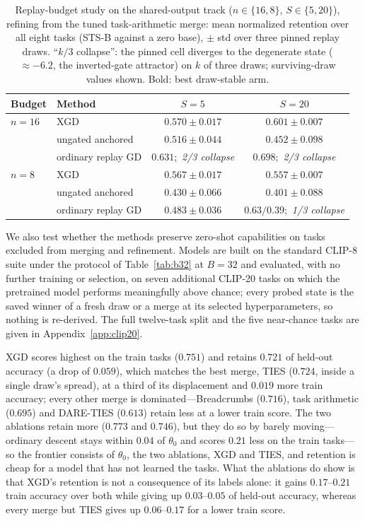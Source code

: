 \documentclass{article} %
\begin{document}
\begin{table}[t]
\centering
\small
\caption{Replay-budget study on the shared-output track ($n\in\{16,8\}$, $S\in\{5,20\}$), refining from the tuned task-arithmetic merge: mean normalized retention over all eight tasks (STS-B against a zero base), $\pm$ std over three pinned replay draws. ``$k/3$ collapse'': the pinned cell diverges to the degenerate state (${\approx}{-}6.2$, the inverted-gate attractor) on $k$ of three draws; surviving-draw values shown. Bold: best draw-stable arm.}
\label{tab:t5budget}
\begin{tabular}{llcc}
\toprule
Budget & Method & $S=5$ & $S=20$ \\
\midrule
$n=16$ & XGD                 & $\mathbf{0.570\pm0.017}$ & $\mathbf{0.601\pm0.007}$ \\
       & ungated anchored    & $0.516\pm0.044$          & $0.452\pm0.098$ \\
       & ordinary replay GD  & $0.631$;\ \emph{2/3 collapse} & $0.698$;\ \emph{2/3 collapse} \\
\midrule
$n=8$  & XGD                 & $\mathbf{0.567\pm0.017}$ & $\mathbf{0.557\pm0.007}$ \\
       & ungated anchored    & $0.430\pm0.066$          & $0.401\pm0.088$ \\
       & ordinary replay GD  & $0.483\pm0.036$          & $0.63/0.39$;\ \emph{1/3 collapse} \\
\bottomrule
\end{tabular}
\end{table}
\fi

We also test whether the methods preserve zero-shot capabilities on tasks excluded from merging and refinement. Models are built on the standard CLIP-8 suite under the protocol of Table~\ref{tab:b32} at $B=32$ and evaluated, with no further training or selection, on seven additional CLIP-20 tasks on which the pretrained model performs meaningfully above chance; every probed state is the saved winner of a fresh draw or a merge at its selected hyperparameters, so nothing is re-derived. The full twelve-task split and the five near-chance tasks are given in Appendix~\ref{app:clip20}.

XGD scores highest on the train tasks ($0.751$) and retains $0.721$ of held-out accuracy (a drop of $0.059$), which matches the best merge, TIES ($0.724$, inside a single draw's spread), at a third of its displacement and $0.019$ more train accuracy; every other merge is dominated---Breadcrumbs ($0.716$), task arithmetic ($0.695$) and DARE-TIES ($0.613$) retain less at a lower train score. The two ablations retain more ($0.773$ and $0.746$), but they do so by barely moving---ordinary descent stays within $0.04$ of $\theta_0$ and scores $0.21$ less on the train tasks---so the frontier consists of $\theta_0$, the two ablations, XGD and TIES, and retention is cheap for a model that has not learned the tasks. What the ablations do show is that XGD's retention is not a consequence of its labels alone: it gains $0.17$--$0.21$ train accuracy over both while giving up $0.03$--$0.05$ of held-out accuracy, whereas every merge but TIES gives up $0.06$--$0.17$ for a lower train score.
\end{document}
